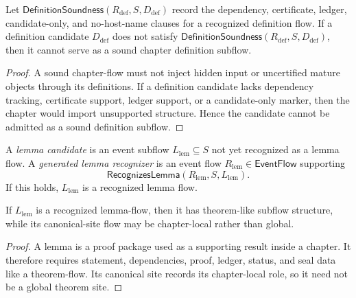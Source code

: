 \begin{theorem}
\label{thm:chapter-manuscript-unsound-definition-blocks}
Let $\mathsf{DefinitionSoundness}(R_{\mathrm{def}},S,D_{\mathrm{def}})$ record the dependency, certificate, ledger, candidate-only, and no-host-name clauses for a recognized definition flow. If a definition candidate $D_{\mathrm{def}}$ does not satisfy $\mathsf{DefinitionSoundness}(R_{\mathrm{def}},S,D_{\mathrm{def}})$, then it cannot serve as a sound chapter definition subflow.
\end{theorem}

\begin{proof}
A sound chapter-flow must not inject hidden input or uncertified mature objects through its definitions. If a definition candidate lacks dependency tracking, certificate support, ledger support, or a candidate-only marker, then the chapter would import unsupported structure. Hence the candidate cannot be admitted as a sound definition subflow.
\end{proof}

\begin{definition}
\label{def:chapter-manuscript-lemma-candidate-recognizer}
A \emph{lemma candidate} is an event subflow $L_{\mathrm{lem}}\subseteq S$ not yet recognized as a lemma flow. A \emph{generated lemma recognizer} is an event flow $R_{\mathrm{lem}}\in\mathsf{EventFlow}$ supporting
$$
  \mathsf{RecognizesLemma}(R_{\mathrm{lem}},S,L_{\mathrm{lem}}).
$$
If this holds, $L_{\mathrm{lem}}$ is a recognized lemma flow.
\end{definition}

\begin{proposition}
\label{prop:chapter-manuscript-lemma-site-local}
If $L_{\mathrm{lem}}$ is a recognized lemma-flow, then it has theorem-like subflow structure, while its canonical-site flow may be chapter-local rather than global.
\end{proposition}

\begin{proof}
A lemma is a proof package used as a supporting result inside a chapter. It therefore requires statement, dependencies, proof, ledger, status, and seal data like a theorem-flow. Its canonical site records its chapter-local role, so it need not be a global theorem site.
\end{proof}

